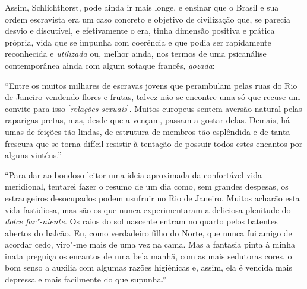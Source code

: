 Assim, Schlichthorst, pode ainda ir mais longe, e ensinar que o Brasil e
sua ordem escravista era um caso concreto e objetivo de civilização que,
se parecia desvio e discutível, e efetivamente o era, tinha dimensão
positiva e prática própria, vida que se impunha com coerência e que
podia ser rapidamente reconhecida e \emph{utilizada} ou, melhor ainda,
nos termos de uma psicanálise contemporânea ainda com algum sotaque
francês, \emph{gozada}:

``Entre os muitos milhares de escravas jovens que perambulam pelas ruas
do Rio de Janeiro vendendo flores e frutas, talvez não se encontre uma
só que recuse um convite para isso {[}\emph{relações sexuais}{]}. Muitos
europeus sentem aversão natural pelas raparigas pretas, mas, desde que a
vençam, passam a gostar delas. Demais, há umas de feições tão lindas, de
estrutura de membros tão esplêndida e de tanta frescura que se torna
difícil resistir à tentação de possuir todos estes encantos por alguns
vinténs.''

``Para dar ao bondoso leitor uma ideia aproximada da confortável vida
meridional, tentarei fazer o resumo de um dia como, sem grandes
despesas, os estrangeiros desocupados podem usufruir no Rio de Janeiro.
Muitos acharão esta vida fastidiosa, mas são os que nunca experimentaram
a deliciosa plenitude do \emph{dolce far"-niente.} Os raios do sol
nascente entram no quarto pelos batentes abertos do balcão. Eu, como
verdadeiro filho do Norte, que nunca fui amigo de acordar cedo, viro"-me
mais de uma vez na cama. Mas a fantasia pinta à minha inata preguiça os
encantos de uma bela manhã, com as mais sedutoras cores, o bom senso a
auxilia com algumas razões higiênicas e, assim, ela é vencida mais
depressa e mais facilmente do que supunha.''

